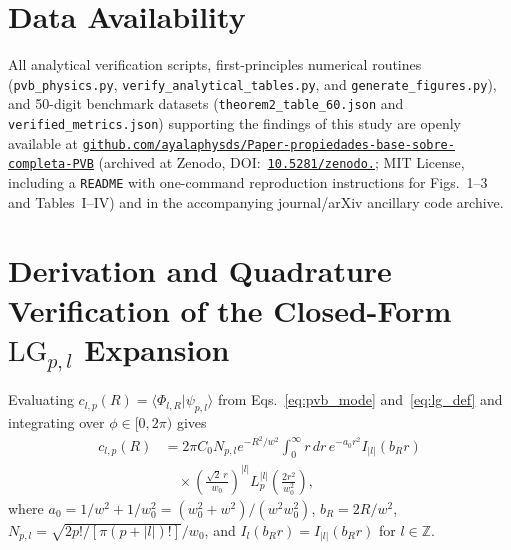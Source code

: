 \documentclass[aps,pra,reprint,nofootinbib,floatfix,longbibliography]{revtex4-2}
\theoremstyle{remark}
\newcommand{\braket}[2]{\langle #1 | #2 \rangle}
\newcommand{\abs}[1]{\lvert #1 \rvert}
\begin{document}
\section*{Data Availability}
{\sloppy All analytical verification scripts, first-principles numerical routines (\texttt{pvb\_\allowbreak physics.py}, \texttt{verify\_\allowbreak analytical\_\allowbreak tables.py}, and \texttt{generate\_\allowbreak figures.py}), and 50-digit benchmark datasets (\texttt{theorem2\_\allowbreak table\_\allowbreak 60.json} and \texttt{verified\_\allowbreak metrics.json}) supporting the findings of this study are openly available at \href{https://github.com/ayalaphysds/Paper-propiedades-base-sobre-completa-PVB}{\texttt{github.com/\allowbreak ayalaphysds/\allowbreak Paper-\allowbreak propiedades-\allowbreak base-\allowbreak sobre-\allowbreak completa-\allowbreak PVB}} (archived at Zenodo, DOI:~\href{https://doi.org/10.5281/zenodo.24426770}{\texttt{10.5281/\allowbreak zenodo.}}; MIT License, including a \texttt{README} with one-command reproduction instructions for Figs.~1--3 and Tables~I--IV) and in the accompanying journal/arXiv ancillary code archive.\par}

\appendix

\section{Derivation and Quadrature Verification of the Closed-Form \texorpdfstring{$\mathrm{LG}_{p,l}$}{LG\_\{p,l\}} Expansion}
\label{app:lg_expansion}

Evaluating $c_{l,p}(R) = \braket{\Phi_{l,R}}{\psi_{p,l}}$ from Eqs.~\eqref{eq:pvb_mode} and~\eqref{eq:lg_def} and integrating over $\phi \in [0,2\pi)$ gives
\begin{align}
c_{l,p}(R) &= 2\pi C_0 N_{p,l} e^{-R^2/w^2} \int_0^\infty r\,dr\, e^{-a_0 r^2} I_{\abs{l}}(b_R r) \nonumber \\
&\quad \times \left(\frac{\sqrt{2}\,r}{w_0}\right)^{\abs{l}} L_p^{\abs{l}}\!\left(\frac{2r^2}{w_0^2}\right),
\label{eq:app_c_int}
\end{align}
where $a_0 = 1/w^2 + 1/w_0^2 = (w_0^2+w^2)/(w^2 w_0^2)$, $b_R = 2R/w^2$, $N_{p,l} = \sqrt{2p!/[\pi(p+\abs{l})!]}/w_0$, and $I_l(b_R r) = I_{\abs{l}}(b_R r)$ for $l \in \mathbb{Z}$.
\end{document}
